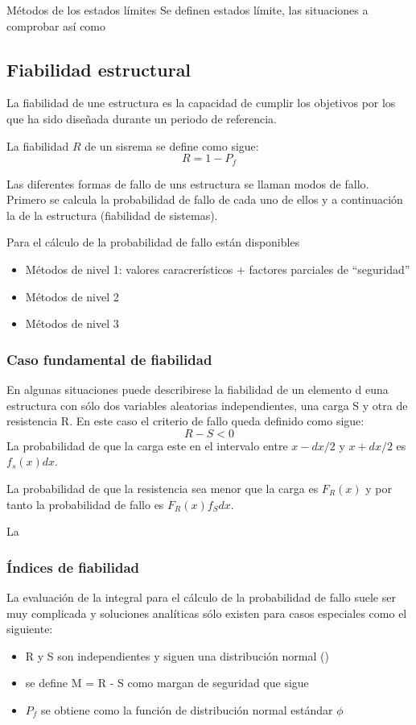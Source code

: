 Métodos de los estados límites
Se definen estados límite, las situaciones a comprobar así como 

\subsection{Fiabilidad estructural}
La fiabilidad de une estructura es la capacidad de cumplir los objetivos por los que ha sido diseñada durante un periodo de referencia.

La fiabilidad $R$ de un sisrema se define como sigue:
\[R = 1 - P_f\]

Las diferentes formas de fallo de uns estructura se llaman modos de fallo. Primero se calcula la probabilidad de fallo de cada uno de ellos y a continuación la de la estructura (fiabilidad de sistemas).

Para el cálculo de la probabilidad de fallo están disponibles
\begin{itemize}
    \item Métodos de nivel 1: valores caracrerísticos + factores parciales de ``seguridad'' %
    \item Métodos de nivel 2
    \item Métodos de nivel 3
\end{itemize}

\subsubsection{Caso fundamental de fiabilidad}
En algunas situaciones puede describirese la fiabilidad de un elemento d euna estructura con sólo dos variables aleatorias independientes, una carga S y otra de resistencia R. En este caso el criterio de fallo queda definido como sigue:
\[R - S < 0\]
La probabilidad de que la carga este en el intervalo entre $x - dx/2$ y $x + dx/2$ es $f_s(x)dx$.


La probabilidad de que la resistencia sea menor que la carga es $F_R(x)$ y por tanto la probabilidad de fallo es $F_R(x)f_Sdx$.

La

\subsubsection{Índices de fiabilidad}
La evaluación de la integral para el cálculo de la probabilidad de fallo suele ser muy complicada y soluciones analíticas sólo existen para casos especiales como el siguiente:
\begin{itemize}
    \item R y S son independientes y siguen una distribución normal ()
    \item se define M = R - S como margan de seguridad que sigue 
    \item $P_f$ se obtiene como la función de distribución normal estándar $\phi$
\end{itemize}

